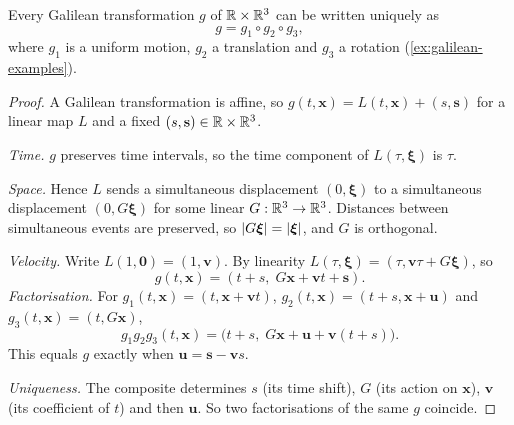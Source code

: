 \begin{theorem}\label{thm:galilean-decomposition}
  Every Galilean transformation $g$ of $\mathbb{R} \times \mathbb{R}^3$ can be written
  uniquely as
  \[
    g = g_1 \circ g_2 \circ g_3,
  \]
  where $g_1$ is a uniform motion, $g_2$ a translation and $g_3$ a rotation
  (\cref{ex:galilean-examples}).
\end{theorem}

\begin{proof}
  A Galilean transformation is affine, so $g(t, \mathbf x) = L(t, \mathbf x) + (s, \mathbf s)$
  for a linear map $L$ and a fixed $(s, \mathbf s) \in \mathbb{R} \times \mathbb{R}^3$.

  \emph{Time.} $g$ preserves time intervals, so the time component of
  $L(\tau, \boldsymbol\xi)$ is $\tau$.

  \emph{Space.} Hence $L$ sends a simultaneous displacement
  $(0, \boldsymbol\xi)$ to a simultaneous displacement $(0, G\boldsymbol\xi)$
  for some linear $G : \mathbb{R}^3 \to \mathbb{R}^3$. Distances between simultaneous events
  are preserved, so $\lvert G\boldsymbol\xi\rvert = \lvert\boldsymbol\xi\rvert$, and $G$ is
  orthogonal.

  \emph{Velocity.} Write $L(1, \mathbf 0) = (1, \mathbf v)$. By linearity
  $L(\tau, \boldsymbol\xi) = (\tau, \mathbf v\tau + G\boldsymbol\xi)$, so
  \[
    g(t, \mathbf x) = (t + s,\; G\mathbf x + \mathbf v t + \mathbf s).
  \]
  \emph{Factorisation.} For $g_1(t, \mathbf x) = (t, \mathbf x + \mathbf v t)$,
  $g_2(t, \mathbf x) = (t + s, \mathbf x + \mathbf u)$ and
  $g_3(t, \mathbf x) = (t, G\mathbf x)$,
  \[
    g_1 g_2 g_3 (t, \mathbf x) = \bigl(t + s,\; G\mathbf x + \mathbf u + \mathbf v(t + s)\bigr).
  \]
  This equals $g$ exactly when $\mathbf u = \mathbf s - \mathbf v s$.

  \emph{Uniqueness.} The composite determines $s$ (its time shift), $G$
  (its action on $\mathbf x$), $\mathbf v$ (its coefficient of $t$) and then
  $\mathbf u$. So two factorisations of the same $g$ coincide.
\end{proof}
